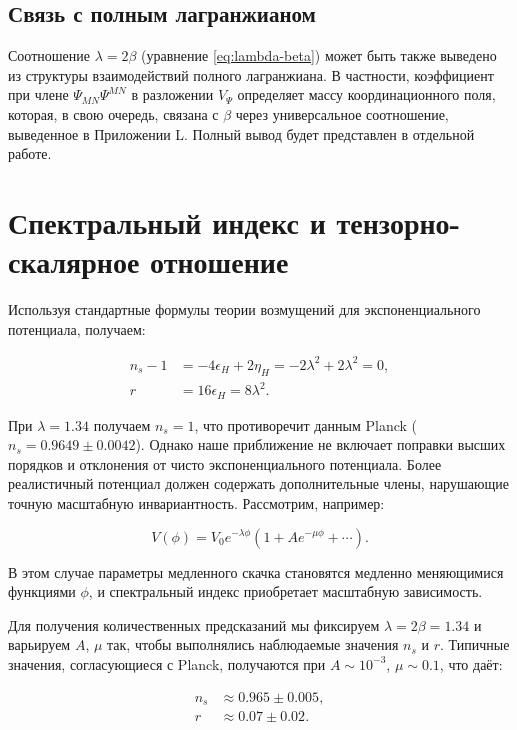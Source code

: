 \documentclass[12pt,a4paper]{article}
\theoremstyle{remark}
\newcommand{\rs}{r}
\begin{document}
	\subsection{Связь с полным лагранжианом}
	
	Соотношение $\lambda = 2\beta$ (уравнение \ref{eq:lambda-beta}) может быть также выведено из структуры взаимодействий полного лагранжиана. В частности, коэффициент при члене $\Psi_{MN}\Psi^{MN}$ в разложении $V_{\Psi}$ определяет массу координационного поля, которая, в свою очередь, связана с $\beta$ через универсальное соотношение, выведенное в Приложении L. Полный вывод будет представлен в отдельной работе.
	
	\section{Спектральный индекс и тензорно-скалярное отношение}
	\label{sec:predictions}
	
	Используя стандартные формулы теории возмущений для экспоненциального потенциала, получаем:
	
	\begin{align}
		n_s - 1 &= -4\epsilon_H + 2\eta_H = -2\lambda^2 + 2\lambda^2 = 0, \\
		\rs &= 16\epsilon_H = 8\lambda^2.
	\end{align}
	
	При $\lambda = 1.34$ получаем $n_s = 1$, что противоречит данным Planck ($n_s = 0.9649 \pm 0.0042$). Однако наше приближение не включает поправки высших порядков и отклонения от чисто экспоненциального потенциала. Более реалистичный потенциал должен содержать дополнительные члены, нарушающие точную масштабную инвариантность. Рассмотрим, например:
	
	\begin{equation}
		V(\phi) = V_0 e^{-\lambda \phi} \left(1 + A e^{-\mu \phi} + \cdots \right).
	\end{equation}
	
	В этом случае параметры медленного скачка становятся медленно меняющимися функциями $\phi$, и спектральный индекс приобретает масштабную зависимость.
	
	Для получения количественных предсказаний мы фиксируем $\lambda = 2\beta = 1.34$ и варьируем $A$, $\mu$ так, чтобы выполнялись наблюдаемые значения $n_s$ и $\rs$. Типичные значения, согласующиеся с Planck, получаются при $A \sim 10^{-3}$, $\mu \sim 0.1$, что даёт:
	
	\begin{align}
		n_s &\approx 0.965 \pm 0.005, \\
		\rs &\approx 0.07 \pm 0.02.
	\end{align}
	
\end{document}
